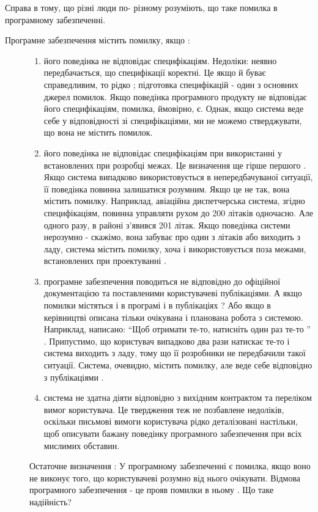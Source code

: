 Справа в тому, що різні люди по- різному розуміють, що таке помилка в програмному забезпеченні.
\begin{description}
\item[{Програмне забезпечення містить помилку, якщо :}] \leavevmode\begin{enumerate}
\item {} 
його поведінка не відповідає специфікаціям. Недоліки: неявно передбачається, що специфікації коректні. Це якщо й буває справедливим, то рідко ; підготовка специфікацій - один з основних джерел помилок. Якщо поведінка програмного продукту не відповідає його специфікаціям, помилка, ймовірно, є. Однак, якщо система веде себе у відповідності зі специфікаціями, ми не можемо стверджувати, що вона не містить помилок.

\item {} 
його поведінка не відповідає специфікаціям при використанні у встановлених при розробці межах. Це визначення ще гірше першого . Якщо система випадково використовується в непередбачуваної ситуації, її поведінка повинна залишатися розумним. Якщо це не так, вона містить помилку. Наприклад, авіаційна диспетчерська система, згідно специфікаціям, повинна управляти рухом до 200 літаків одночасно. Але одного разу, в районі з'явився 201 літак. Якщо поведінка системи нерозумно - скажімо, вона забуває про один з літаків або виходить з ладу, система містить помилку, хоча і використовується поза межами, встановлених при проектуванні .

\item {} 
програмне забезпечення поводиться не відповідно до офіційної документацією та поставленими користувачеві публікаціями. А якщо помилки містяться і в програмі і в публікаціях ? Або якщо в керівництві описана тільки очікувана і планована робота з системою. Наприклад, написано: ``Щоб отримати те-то, натисніть один раз те-то '' . Припустимо, що користувач випадково два рази натискає те-то і система виходить з ладу, тому що її розробники не передбачили такої ситуації. Система, очевидно, містить помилку, але веде себе відповідно з публікаціями .

\item {} 
система не здатна діяти відповідно з вихідним контрактом та переліком вимог користувача.    Це твердження теж не позбавлене недоліків, оскільки письмові вимоги користувача рідко деталізовані настільки, щоб описувати бажану поведінку програмного забезпечення при всіх мислимих обставин.

\end{enumerate}

Остаточне визначення :
У програмному забезпеченні є помилка, якщо воно не виконує того, що користувачеві розумно від нього очікувати. Відмова програмного забезпечення - це прояв помилки в ньому .
Що таке надійність?

\end{description}

